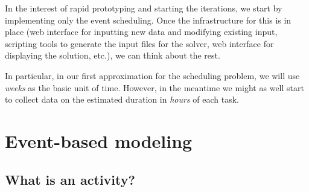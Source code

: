 \documentclass[11pt,reqno]{amsart}
\numberwithin{equation}{section}
\begin{document}
In the interest of rapid prototyping and starting the iterations, we start by implementing
only the event scheduling. Once the infrastructure for this is in place (web interface for
inputting new data and modifying existing input, scripting tools to generate the input
files for the solver, web interface for displaying the solution, etc.), we can think about
the rest.

In particular, in our first approximation for the scheduling problem, we will use
\emph{weeks} as the basic unit of time. However, in the meantime we might as well start to
collect data on the estimated duration in \emph{hours} of each task.


\section{Event-based modeling}


\subsection{What is an activity?}
\end{document}
